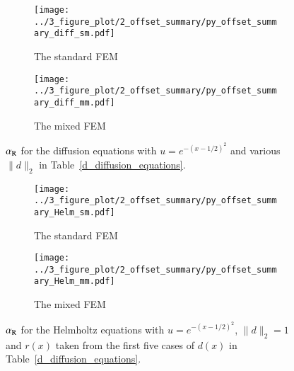 \documentclass[review,3p]{elsarticle}
\begin{document}
\begin{figure}[!ht]
	\hspace{2.5cm}
    \begin{subfigure}{5.4cm}
        \texttt{[image: ../3\_figure\_plot/2\_offset\_summary/py\_offset\_summary\_diff\_sm.pdf]}
        \caption{The standard FEM}
        \label{py_offset_summary_diff_sm}
    \end{subfigure}
    \hspace{-0.2cm}
    \begin{subfigure}{5.4cm}
        \texttt{[image: ../3\_figure\_plot/2\_offset\_summary/py\_offset\_summary\_diff\_mm.pdf]}
        \caption{The mixed FEM}
        \label{py_offset_summary_diff_mm}
    \end{subfigure}
\caption{$\alpha_{\rm R}$ for the diffusion equations with $u=e^{-{(x-1/2)^2}}$ and various $\|d\|_2$ in Table~\ref{d_diffusion_equations}.}
\label{py_offset_summary_diff}
\end{figure}

\begin{figure}[!ht]
	\hspace{2.5cm}
    \begin{subfigure}{5.4cm}
        \texttt{[image: ../3\_figure\_plot/2\_offset\_summary/py\_offset\_summary\_Helm\_sm.pdf]}
        \caption{The standard FEM}
        \label{py_offset_summary_Helm_sm}
    \end{subfigure}
    \hspace{-0.2cm}
    \begin{subfigure}{5.4cm}
        \texttt{[image: ../3\_figure\_plot/2\_offset\_summary/py\_offset\_summary\_Helm\_mm.pdf]}
        \caption{The mixed FEM}
        \label{py_offset_summary_Helm_mm}
    \end{subfigure}
\caption{$\alpha_{\rm R}$ for the Helmholtz equations with $u=e^{-{(x-1/2)^2}}$, $\|d\|_2=1$ and $r(x)$ taken from the first five cases of $d(x)$ in Table~\ref{d_diffusion_equations}.}
\label{py_offset_summary_Helm}
\end{figure}
\end{document}
